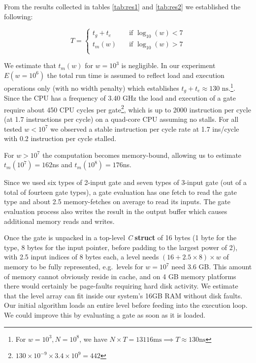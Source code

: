 \par
From the results collected in tables \ref{tab:res1} and \ref{tab:res2} we established the following:

\[ T =
  \begin{cases}
    t_g + t_e       & \quad \text{if } \log_{10}(w) < 7\\
    t_m(w) & \quad \text{if } \log_{10}(w) > 7\\
  \end{cases}
\]

We estimate that $t_m(w)$ for $w = 10^3$ is negligible. In our experiment $E(w = 10^6)$ the total run time is assumed to reflect load and execution operations only (with no width penalty) which establishes $t_g + t_e \approx 130\text{ ns}$.\footnote{ For $w = 10^3, N=10^8$, we have $N \times T = 13116 \text{ms} \implies T \approx 130 \text{ns}$ }. 
Since the CPU has a frequency of 3.40 GHz the load and execution of a gate require about 450 CPU cycles per gate\footnote{$130 \times 10^{-9} \times 3.4 \times 10^9 = 442$}, which is up to 2000 instruction per cycle (at 1.7 instructions per cycle) on a quad-core CPU assuming no stalls. For all tested $w < 10^7$ we observed a stable instruction per cycle rate at 1.7 ins/cycle with 0.2 instruction per cycle stalled.
\par
For $ w > 10^7$ the computation becomes memory-bound, allowing us to estimate $t_m(10^7) = 162$ns and $t_m(10^8) = 176$ns. 
\par
Since we used six types of 2-input gate and seven types of 3-input gate (out of a total of fourteen gate types), a gate evaluation has one fetch to read the gate type and about 2.5 memory-fetches on average to read its inputs. The gate evaluation process also writes the result in the output buffer which causes additional memory reads and writes. 
\par
Once the gate is unpacked in a top-level \textit{C} \textbf{struct} of 16 bytes (1 byte for the type, 8 bytes for the input pointer, before padding to the largest power of 2), with 2.5 input indices of 8 bytes each, a level needs $ (16 + 2.5 \times 8) \times w $ of memory to be fully represented, e.g.\ levels for $w = 10^7$ need 3.6 GB. This amount of memory cannot obviously reside in cache, and on 4 GB memory platforms there would certainly be page-faults requiring hard disk activity. We estimate that the level array can fit inside our system's 16GB RAM without disk faults. Our initial algorithm loads an entire level before feeding into the execution loop. We could improve this by evaluating a gate as soon as it is loaded.  
